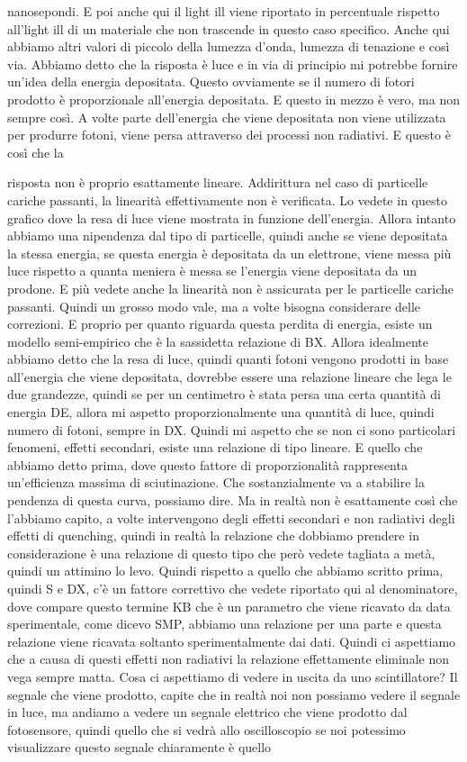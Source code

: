 nanosepondi. E poi anche qui il light ill viene riportato in percentuale rispetto all'light ill di un materiale che non trascende in questo caso specifico. Anche qui abbiamo altri valori di piccolo della lumezza d'onda, lumezza di tenazione e così via. Abbiamo detto che la risposta è luce e in via di principio mi potrebbe fornire un'idea della energia depositata. Questo ovviamente se il numero di fotori prodotto è proporzionale all'energia depositata. E questo in mezzo è vero, ma non sempre così. A volte parte dell'energia che viene depositata non viene utilizzata per produrre fotoni, viene persa attraverso dei processi non radiativi. E questo è così che la 

risposta non è proprio esattamente lineare. Addirittura nel caso di particelle cariche passanti, la linearità effettivamente non è verificata. Lo vedete in questo grafico dove la resa di luce viene mostrata in funzione dell'energia. Allora intanto abbiamo una nipendenza dal tipo di particelle, quindi anche se viene depositata la stessa energia, se questa energia è depositata da un elettrone, viene messa più luce rispetto a quanta meniera è messa se l'energia viene depositata da un prodone. E più vedete anche la linearità non è assicurata per le particelle cariche passanti. Quindi un grosso modo vale, ma a volte bisogna considerare delle correzioni. E proprio per quanto riguarda questa perdita di energia, esiste un modello semi-empirico che è la sassidetta relazione di BX. Allora idealmente abbiamo detto che la resa di luce, quindi quanti fotoni vengono prodotti in base all'energia che viene depositata, dovrebbe essere una relazione lineare che lega le due grandezze, quindi se per un centimetro è stata persa una certa quantità di energia DE, allora mi aspetto proporzionalmente una quantità di luce, quindi numero di fotoni, sempre in DX. Quindi mi aspetto che se non ci sono particolari fenomeni, effetti secondari, esiste una relazione di tipo lineare. E quello che abbiamo detto prima, dove questo fattore di proporzionalità rappresenta un'efficienza massima di sciutinazione. Che sostanzialmente va a stabilire la pendenza di questa curva, possiamo dire. Ma in realtà non è esattamente così che l'abbiamo capito, a volte intervengono degli effetti secondari e non radiativi degli effetti di quenching, quindi in realtà la relazione che dobbiamo prendere in considerazione è una relazione di questo tipo che però vedete tagliata a metà, quindi un attimino lo levo. Quindi rispetto a quello che abbiamo scritto prima, quindi S e DX, c'è un fattore correttivo che vedete riportato qui al denominatore, dove compare questo termine KB che è un parametro che viene ricavato da data sperimentale, come dicevo SMP, abbiamo una relazione per una parte e questa relazione viene ricavata soltanto sperimentalmente dai dati. Quindi ci aspettiamo che a causa di questi effetti non radiativi la relazione effettamente eliminale non vega sempre matta. Cosa ci aspettiamo di vedere in uscita da uno scintillatore? Il segnale che viene prodotto, capite che in realtà noi non possiamo vedere il segnale in luce, ma andiamo a vedere un segnale elettrico che viene prodotto dal fotosensore, quindi quello che si vedrà allo oscilloscopio se noi potessimo visualizzare questo segnale chiaramente è quello 